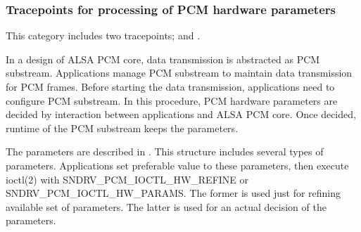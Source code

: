 \documentclass[a4paper,8pt,english]{sphinxmanual}
\begin{document}
\subsubsection{Tracepoints for processing of PCM hardware parameters}
\label{sound/designs/tracepoints:tracepoints-for-processing-of-pcm-hardware-parameters}
This category includes two tracepoints;  and
.

In a design of ALSA PCM core, data transmission is abstracted as PCM substream.
Applications manage PCM substream to maintain data transmission for PCM frames.
Before starting the data transmission, applications need to configure PCM
substream. In this procedure, PCM hardware parameters are decided by
interaction between applications and ALSA PCM core. Once decided, runtime of
the PCM substream keeps the parameters.

The parameters are described in . This
structure includes several types of parameters. Applications set preferable
value to these parameters, then execute ioctl(2) with SNDRV\_PCM\_IOCTL\_HW\_REFINE
or SNDRV\_PCM\_IOCTL\_HW\_PARAMS. The former is used just for refining available
set of parameters. The latter is used for an actual decision of the parameters.
\end{document}
